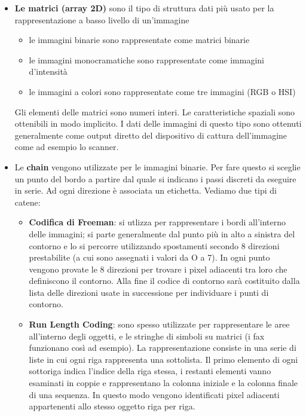 \begin{itemize}

\item \textbf{Le matrici (array 2D)} sono il tipo di struttura dati più usato per la rappresentazione a basso livello di un'immagine
\begin{itemize}
	\item le immagini binarie sono rappresentate come matrici binarie
	\item le immagini monocramatiche sono rappresentate come immagini d'intensità
	\item le immagini a colori sono rappresentate come tre immagini (RGB o HSI)
\end{itemize}

Gli elementi delle matrici sono numeri interi. Le caratteristiche spaziali sono ottenibili in modo implicito. I dati delle immagini di questo tipo sono ottenuti generalmente come output diretto del dispositivo di cattura dell'immagine come ad esempio lo scanner.

\item Le \textbf{chain} vengono utilizzate per le immagini binarie. Per fare questo si sceglie un punto del bordo a partire dal quale si indicano i passi discreti da eseguire in serie. Ad ogni direzione è associata un etichetta. Vediamo due tipi di catene:

\begin{itemize}
\item \textbf{Codifica di Freeman}: si utlizza per rappresentare i bordi all'interno delle immagini; si parte generalmente dal punto più in alto a sinistra del contorno e lo si percorre utilizzando spostamenti secondo 8 direzioni prestabilite (a cui sono assegnati i valori da O a 7). In ogni punto vengono provate le 8 direzioni per trovare i pixel adiacenti tra loro che definiscono il contorno. Alla fine il codice di contorno sarà costituito dalla lista delle direzioni usate in successione per individuare i punti di contorno.

\item \textbf{Run Length Coding}: sono spesso utilizzate per rappresentare le aree all'interno degli oggetti, e le stringhe di simboli su matrici (i fax funzionano così ad esempio). La rappresentazione consiste in una serie di liste in cui ogni riga rappresenta una sottolista. Il primo elemento di ogni sottoriga indica l'indice della riga stessa, i restanti elementi vanno esaminati in coppie e rappresentano la colonna iniziale e la colonna finale di una sequenza. In questo modo vengono identificati pixel adiacenti appartenenti allo stesso oggetto riga per riga.
\end{itemize}
\end{itemize}

